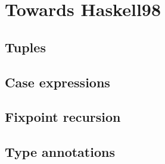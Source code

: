 \chapter{Towards Haskell98}
\section{Tuples}
\section{Case expressions}
\section{Fixpoint recursion}
\section{Type annotations}
